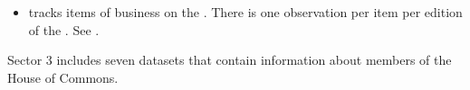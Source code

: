 \begin{itemize}
	
	\item {} tracks items of business on the . There is one observation per item per edition of the . See .
	
%	
%	
%	
\end{itemize}

\myline


Sector 3 includes seven datasets that contain information about members of the House of Commons. 

